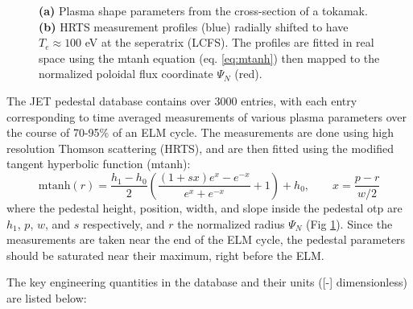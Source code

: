 \documentclass[a4paper, twoside, final, 12pt]{article}
\begin{document}
\begin{figure}
\begin{subfigure}{0.60\linewidth}
		\caption{}
		\label{subfig:mtanhfit}
	\end{subfigure}\hfill
	\caption{ \textbf{(a)} Plasma shape parameters from the cross-section of a tokamak. \textbf{(b)} HRTS measurement profiles (blue) radially shifted to have $T_e \approx 100$ eV at the seperatrix (LCFS). The profiles are fitted in real space using the mtanh equation (eq. \ref{eq:mtanh}) then mapped to the normalized poloidal flux coordinate $\Psi_N$ (red).}
	\label{fig:pedestal_db_figs}
\end{figure}

The JET pedestal database contains over 3000 entries, with each entry corresponding to time averaged measurements of various plasma parameters over the course of 70-95\% of an ELM cycle.
The measurements are done using high resolution Thomson scattering (HRTS)\cite{Pasqualotto_2004}, and are then fitted using the modified tangent hyperbolic function (mtanh): 
\begin{equation} \label{eq:mtanh}
\text{mtanh}(r) = \frac{h_1 - h_0}{2} \left( \frac{(1 + sx) e^x - e^{-x}}{e^x + e^{-x}} + 1\right) + h_0 , \quad \quad x=\frac{p-r}{w/2}
\end{equation}
where the pedestal height, position, width, and slope inside the pedestal otp are $h_1$, $p$, $w$, and $s$ respectively, and $r$ the normalized radius $\Psi_N$ (Fig \ref{subfig:mtanhfit}). 
Since the measurements are taken near the end of the ELM cycle, the pedestal parameters should be saturated near their maximum, right before the ELM.

The key engineering quantities in the database and their units ([-] dimensionless) are listed below:
\end{document}
